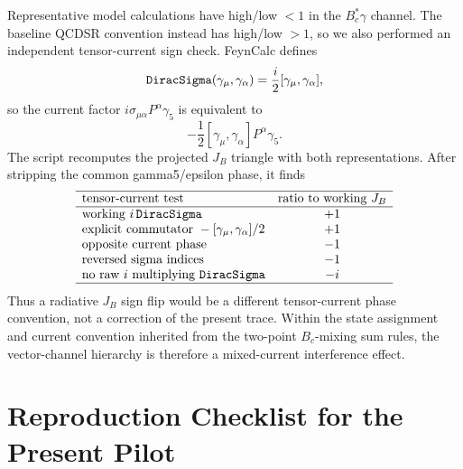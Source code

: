 \documentclass[11pt]{article}
\begin{document}
Representative model calculations have high/low \(<1\) in the
\(B_c^\ast\gamma\) channel.  The baseline QCDSR convention instead has
high/low \(>1\), so we also performed an independent tensor-current sign check.
FeynCalc defines
\[
{\tt DiracSigma}(\gamma_\mu,\gamma_\alpha)
=\frac{i}{2}[\gamma_\mu,\gamma_\alpha],
\]
so the current factor \(i\sigma_{\mu\alpha}P^\alpha\gamma_5\) is equivalent to
\[
-\frac{1}{2}[\gamma_\mu,\gamma_\alpha]P^\alpha\gamma_5 .
\]
The script  recomputes the
projected \(J_B\) triangle with both representations.  After stripping the
common gamma5/epsilon phase, it finds
\[
\begin{array}{lc}
\hline
\text{tensor-current test} & \text{ratio to working }J_B\\
\hline
\text{working }i\,{\tt DiracSigma} & +1\\
\text{explicit commutator }-[\gamma_\mu,\gamma_\alpha]/2 & +1\\
\text{opposite current phase} & -1\\
\text{reversed sigma indices} & -1\\
\text{no raw }i\text{ multiplying }{\tt DiracSigma} & -i\\
\hline
\end{array}
\]
Thus a radiative \(J_B\) sign flip would be a different tensor-current phase
convention, not a correction of the present trace.  Within the state assignment
and current convention inherited from the two-point \(B_c\)-mixing sum rules,
the vector-channel hierarchy is therefore a mixed-current interference effect.

\section{Reproduction Checklist for the Present Pilot}
\end{document}
